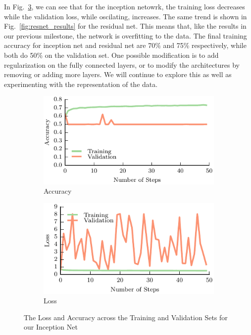 \documentclass[letterpaper, 10 pt, conference]{../ieeeconf}
\newcommand{\figref}[1]{Fig.~\ref{#1}} %
\begin{document}
In \figref{fig:inception_results}, we can see that for the inception netowrk, the training loss decreases while the validation loss, while oscilating, increases. 
The same trend is shown in \figref{fig:resnet_results} for the residual net. 
This means that, like the results in our previous milestone, the network is overfitting to the data. 
The final training accuracy for inception net and residual net are 70\% and 75\% respectively, while both do 50\% on the validation set. 
One possible modification is to add regularization on the fully connected layers, or to modify the architectures by removing or adding more layers. 
We will continue to explore this as well as experimenting with the representation of the data.

\begin{figure}[t!]
    \begin{subfigure}[t]{0.49\textwidth}
        \includegraphics[width=0.75\columnwidth]{figs/inception_accuracy.pdf}
        \caption{Accuracy} \label{fig:accuracy}
        \end{subfigure}
    \begin{subfigure}[t]{0.49\textwidth}
        \includegraphics[width=0.75\columnwidth]{figs/inception_loss.pdf}
        \caption{Loss} \label{fig:loss}
    \end{subfigure}
\caption{The Loss and Accuracy across the Training and Validation Sets for our Inception Net} \label{fig:inception_results}
\end{figure}
\end{document}

